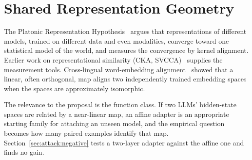 \section{Shared Representation Geometry}\label{sec:lit:geometry}

The Platonic Representation Hypothesis~ argues that representations of different models, trained on different data and even modalities, converge toward one statistical model of the world, and measures the convergence by kernel alignment. Earlier work on representational similarity (CKA, SVCCA)~ supplies the measurement tools. Cross-lingual word-embedding alignment~ showed that a linear, often orthogonal, map aligns two independently trained embedding spaces when the spaces are approximately isomorphic.

The relevance to the proposal is the function class. If two LLMs' hidden-state spaces are related by a near-linear map, an affine adapter is an appropriate starting family for attaching an unseen model, and the empirical question becomes how many paired examples identify that map. Section~\ref{sec:attack:negative} tests a two-layer adapter against the affine one and finds no gain.

